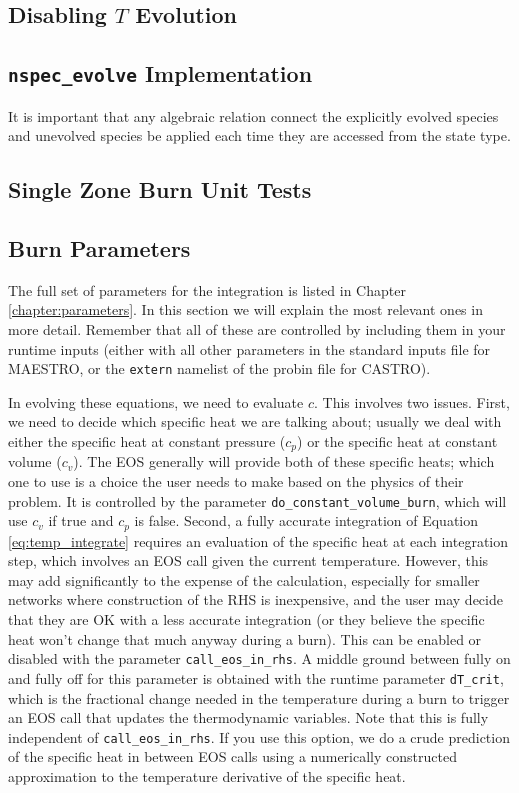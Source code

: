 \subsection{Disabling $T$ Evolution}


\subsection{{\tt nspec\_evolve} Implementation}

It is important that any algebraic relation connect the
explicitly evolved species and unevolved species be applied each
time they are accessed from the state type.  



\subsection{Single Zone Burn Unit Tests}


\subsection{Burn Parameters}

The full set of parameters for the integration is listed in Chapter \ref{chapter:parameters}.
In this section we will explain the most relevant ones in more detail.
Remember that all of these are controlled by including them in your runtime
inputs (either with all other parameters in the standard inputs file for
MAESTRO, or the \texttt{extern} namelist of the probin file for CASTRO).

In evolving these equations, we need to evaluate $c$. This involves two
issues. First, we need to decide which specific heat we are talking about;
usually we deal with either the specific heat at constant pressure ($c_p$)
or the specific heat at constant volume ($c_v$). The EOS generally will
provide both of these specific heats; which one to use is a choice the user
needs to make based on the physics of their problem. It is controlled by the
parameter \texttt{do\_constant\_volume\_burn}, which will use $c_v$ if true
and $c_p$ is false. Second, a fully accurate integration of Equation
\ref{eq:temp_integrate} requires an evaluation of the specific heat at
each integration step, which involves an EOS call given the current temperature.
However, this may add significantly to the expense of the calculation,
especially for smaller networks where construction of the RHS is inexpensive,
and the user may decide that they are OK with a less accurate integration
(or they believe the specific heat won't change that much anyway during a burn).
This can be enabled or disabled with the parameter \texttt{call\_eos\_in\_rhs}.
A middle ground between fully on and fully off for this parameter is obtained
with the runtime parameter \texttt{dT\_crit}, which is the fractional change
needed in the temperature during a burn to trigger an EOS call that updates
the thermodynamic variables. Note that this is fully independent of
\texttt{call\_eos\_in\_rhs}. If you use this option, we do a crude prediction
of the specific heat in between EOS calls using a numerically constructed
approximation to the temperature derivative of the specific heat.

